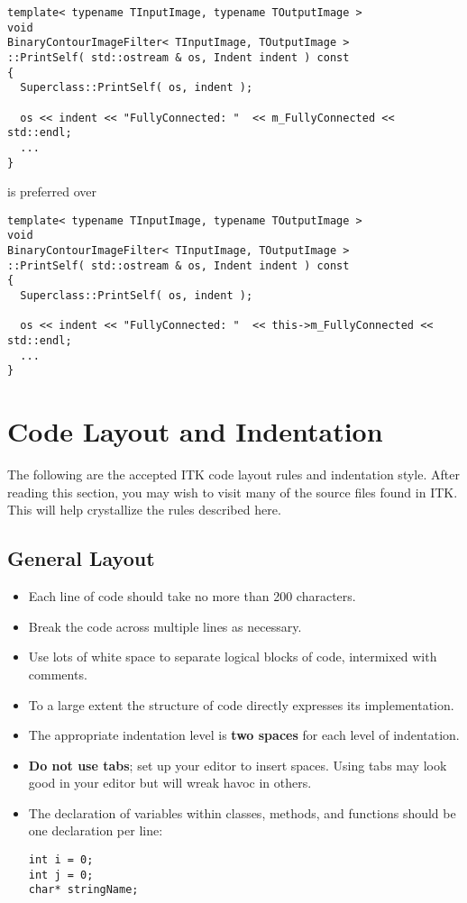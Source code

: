 \small
\begin{verbatim}
template< typename TInputImage, typename TOutputImage >
void
BinaryContourImageFilter< TInputImage, TOutputImage >
::PrintSelf( std::ostream & os, Indent indent ) const
{
  Superclass::PrintSelf( os, indent );

  os << indent << "FullyConnected: "  << m_FullyConnected << std::endl;
  ...
}
\end{verbatim}
\normalsize

is preferred over

\small
\begin{verbatim}
template< typename TInputImage, typename TOutputImage >
void
BinaryContourImageFilter< TInputImage, TOutputImage >
::PrintSelf( std::ostream & os, Indent indent ) const
{
  Superclass::PrintSelf( os, indent );

  os << indent << "FullyConnected: "  << this->m_FullyConnected << std::endl;
  ...
}
\end{verbatim}
\normalsize


\section{Code Layout and Indentation}
\label{sec:CodeLayoutAndIndentation}

The following are the accepted ITK code layout rules and indentation style.
After reading this section, you may wish to visit many of the source files found
in ITK. This will help crystallize the rules described here.


\subsection{General Layout}
\label{subsec:GeneralLayout}

\begin{itemize}
\item Each line of code should take no more than 200 characters.
\item Break the code across multiple lines as necessary.
\item Use lots of white space to separate logical blocks of code, intermixed
with comments.
\item To a large extent the structure of code directly expresses its
implementation.
\item The appropriate indentation level is \textbf{two spaces} for each level of
indentation.
\item \textbf{Do not use tabs}; set up your editor to insert spaces. Using tabs
may look good in your editor but will wreak havoc in others.
\item The declaration of variables within classes, methods, and functions should
be one declaration per line:

\small
\begin{verbatim}
int i = 0;
int j = 0;
char* stringName;
\end{verbatim}
\normalsize
\end{itemize}

